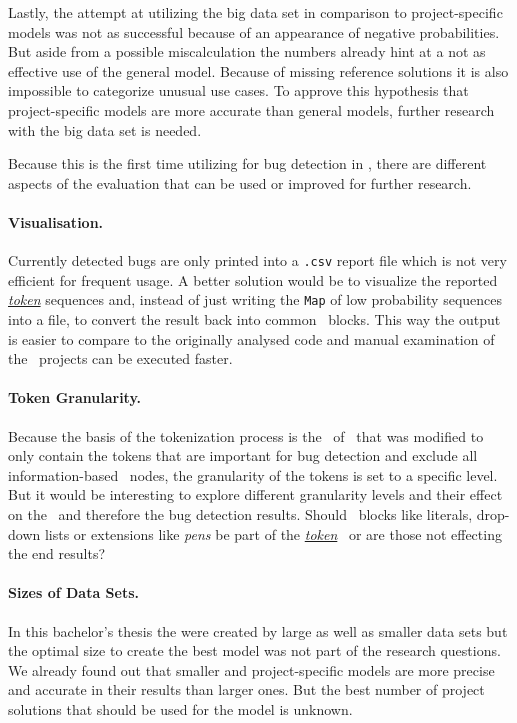 Lastly, the attempt at utilizing the big data set in comparison to project-specific models was not as successful because of an appearance of negative probabilities. But aside from a possible miscalculation the numbers already hint at a not as effective use of the general model. Because of missing reference solutions it is also impossible to categorize unusual use cases. To approve this hypothesis that project-specific models are more accurate than general models, further research with the big data set is needed.

Because this is the first time utilizing  for bug detection in \scratch{}, there are different aspects of the evaluation that can be used or improved for further research. 

\paragraph{Visualisation.}
Currently detected bugs are only printed into a \texttt{.csv} report file which is not very efficient for frequent usage. A better solution would be to visualize the reported \hyperref[def:token]{\textit{token}} sequences and, instead of just writing the \texttt{Map} of low probability sequences into a file, to convert the result back into common \scratch\ blocks. This way the output is easier to compare to the originally analysed code and manual examination of the \scratch\ projects can be executed faster. 

\paragraph{Token Granularity.}
Because the basis of the tokenization process is the \AST\ of \litterbox\ that was modified to only contain the tokens that are important for bug detection and exclude all information-based \AST\ nodes, the granularity of the tokens is set to a specific level. But it would be interesting to explore different granularity levels and their effect on the \ngram\ and therefore the bug detection results. Should \scratch\ blocks like literals, drop-down lists or extensions like \textit{pens} be part of the \hyperref[def:token]{\textit{token}} \AST\ or are those not effecting the end results? 

\paragraph{Sizes of Data Sets.}
In this bachelor's thesis the  were created by large as well as smaller data sets but the optimal size to create the best model was not part of the research questions. We already found out that smaller and project-specific models are more precise and accurate in their results than larger ones. But the best number of project solutions that should be used for the model is unknown. 

